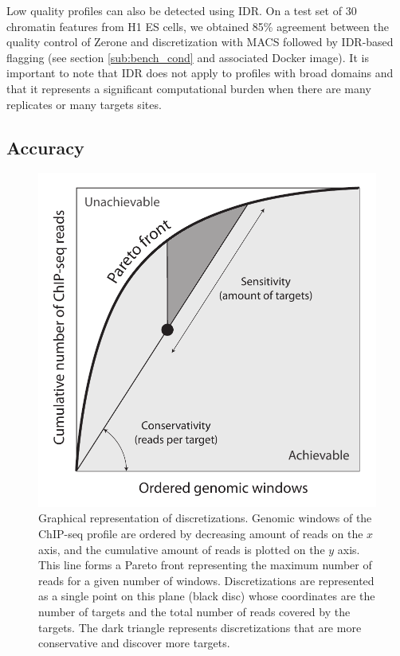 \documentclass{bioinfo}
\begin{document}
Low quality profiles can also be detected using IDR. On a test
set of 30 chromatin features from H1 ES cells, we obtained 85\%
agreement between the quality control of Zerone and discretization
with MACS followed by IDR-based flagging (see section
\ref{sub:bench_cond} and associated Docker
image). It is important to note that IDR does not apply to
profiles with broad domains and that it represents a significant
computational burden when there are many replicates or many targets
sites.

\subsection{Accuracy}

\begin{figure}[!tpb]
\centerline{\includegraphics[scale=0.5]{pareto_front_explanation.pdf}}
\caption{
  Graphical representation of discretizations. Genomic
  windows of the ChIP-seq profile are ordered by decreasing amount of
  reads on the $x$ axis, and the cumulative amount of reads is plotted
  on the $y$ axis. This line forms a Pareto front representing the
  maximum number of reads for a given number of windows. Discretizations
  are represented as a single point on this plane (black disc) whose
  coordinates are the number of targets and the total number of reads
  covered by the targets. The dark triangle represents discretizations
  that are more conservative and discover more targets.
}
\label{fig:expl}
\end{figure}
\end{document}
